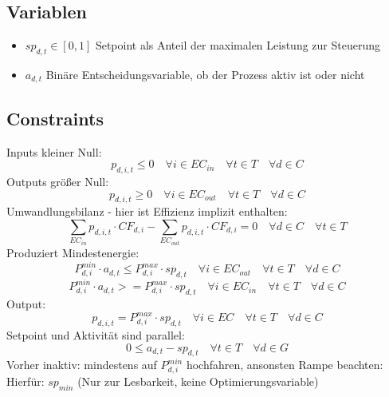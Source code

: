 \documentclass[]{article}
\begin{document}
\subsection{Variablen}
\begin{itemize}
    \item $sp_{d,t} \in [0,1]$ Setpoint als Anteil der maximalen Leistung zur Steuerung
    \item $a_{d,t}$ Binäre Entscheidungsvariable, ob der Prozess aktiv ist oder nicht
\end{itemize}
\subsection{Constraints}
Inputs kleiner Null:
\begin{equation}
    p_{d,i,t} \leq 0 \quad \forall i \in EC_{in} \quad \forall t \in T \quad \forall d \in C
\end{equation}
Outputs größer Null:
\begin{equation}
    p_{d,i,t} \geq 0 \quad \forall i \in EC_{out} \quad \forall t \in T \quad \forall d \in C
\end{equation}
Umwandlungsbilanz - hier ist Effizienz implizit enthalten:
\begin{equation}
    \sum_{EC_{in}} p_{d,i,t} \cdot CF_{d,i} - \sum_{EC_{out}}p_{d,i,t} \cdot CF_{d,i} = 0 \quad \forall d \in C \quad \forall t \in T
\end{equation}
Produziert Mindestenergie:
\begin{equation}
    P_{d,i}^{min} \cdot a_{d,t} \leq P_{d,i}^{max} \cdot sp_{d,t} \quad \forall i \in EC_{out} \quad \forall t \in T \quad \forall d \in C
\end{equation}
\begin{equation}
    P_{d,i}^{min} \cdot a_{d,t} >= P_{d,i}^{max} \cdot sp_{d,t} \quad \forall i \in EC_{in} \quad \forall t \in T \quad \forall d \in C
\end{equation}
Output:
\begin{equation}
    p_{d,i,t} = P_{d,i}^{max} \cdot sp_{d,t} \quad \forall i \in EC \quad \forall t \in T \quad \forall d \in C
\end{equation}
Setpoint und Aktivität sind parallel:
\begin{equation}
    0 \leq a_{d,t} - sp_{d,t} \quad \forall t \in T \quad \forall d \in G
\end{equation}
Vorher inaktiv: mindestens auf $P_{d,i}^{min}$ hochfahren, ansonsten Rampe beachten:
Hierfür: $sp_{min}$ (Nur zur Lesbarkeit, keine Optimierungsvariable)
\end{document}
